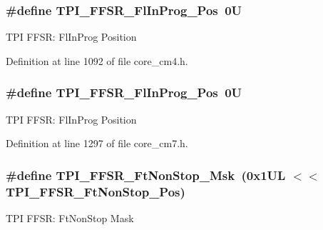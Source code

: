 \subsubsection[{\texorpdfstring{T\+P\+I\+\_\+\+F\+F\+S\+R\+\_\+\+Fl\+In\+Prog\+\_\+\+Pos}{TPI_FFSR_FlInProg_Pos}}]{\setlength{\rightskip}{0pt plus 5cm}\#define T\+P\+I\+\_\+\+F\+F\+S\+R\+\_\+\+Fl\+In\+Prog\+\_\+\+Pos~0U}\hypertarget{group___c_m_s_i_s___t_p_i_ga542ca74a081588273e6d5275ba5da6bf}{}\label{group___c_m_s_i_s___t_p_i_ga542ca74a081588273e6d5275ba5da6bf}
T\+PI F\+F\+SR\+: Fl\+In\+Prog Position 

Definition at line 1092 of file core\+\_\+cm4.\+h.

\subsubsection[{\texorpdfstring{T\+P\+I\+\_\+\+F\+F\+S\+R\+\_\+\+Fl\+In\+Prog\+\_\+\+Pos}{TPI_FFSR_FlInProg_Pos}}]{\setlength{\rightskip}{0pt plus 5cm}\#define T\+P\+I\+\_\+\+F\+F\+S\+R\+\_\+\+Fl\+In\+Prog\+\_\+\+Pos~0U}\hypertarget{group___c_m_s_i_s___t_p_i_ga542ca74a081588273e6d5275ba5da6bf}{}\label{group___c_m_s_i_s___t_p_i_ga542ca74a081588273e6d5275ba5da6bf}
T\+PI F\+F\+SR\+: Fl\+In\+Prog Position 

Definition at line 1297 of file core\+\_\+cm7.\+h.

\subsubsection[{\texorpdfstring{T\+P\+I\+\_\+\+F\+F\+S\+R\+\_\+\+Ft\+Non\+Stop\+\_\+\+Msk}{TPI_FFSR_FtNonStop_Msk}}]{\setlength{\rightskip}{0pt plus 5cm}\#define T\+P\+I\+\_\+\+F\+F\+S\+R\+\_\+\+Ft\+Non\+Stop\+\_\+\+Msk~(0x1\+U\+L $<$$<$ T\+P\+I\+\_\+\+F\+F\+S\+R\+\_\+\+Ft\+Non\+Stop\+\_\+\+Pos)}\hypertarget{group___c_m_s_i_s___t_p_i_gaaa313f980974a8cfc7dac68c4d805ab1}{}\label{group___c_m_s_i_s___t_p_i_gaaa313f980974a8cfc7dac68c4d805ab1}
T\+PI F\+F\+SR\+: Ft\+Non\+Stop Mask 

